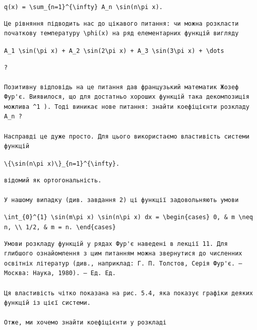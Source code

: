 \documentclass[
  ukrainian,
]{article}
\begin{document}
\texttt{q(x)\ =\ \textbackslash{}sum\_\{n=1\}\^{}\{\textbackslash{}infty\}\ A\_n\ \textbackslash{}sin(n\textbackslash{}pi\ x).}

\begin{verbatim}
Це рівняння підводить нас до цікавого питання: чи можна розкласти початкову температуру \phi(x) на ряд елементарних функцій вигляду
\end{verbatim}

\texttt{A\_1\ \textbackslash{}sin(\textbackslash{}pi\ x)\ +\ A\_2\ \textbackslash{}sin(2\textbackslash{}pi\ x)\ +\ A\_3\ \textbackslash{}sin(3\textbackslash{}pi\ x)\ +\ \textbackslash{}dots}

\begin{verbatim}
?

Позитивну відповідь на це питання дав французький математик Жозеф Фур'є. Виявилося, що для достатньо хороших функцій така декомпозиція можлива ^1 ). Тоді виникає нове питання: знайти коефіцієнти розкладу A_n ?

Насправді це дуже просто. Для цього використаємо властивість системи функцій
\end{verbatim}

\texttt{\textbackslash{}\{\textbackslash{}sin(n\textbackslash{}pi\ x)\textbackslash{}\}\_\{n=1\}\^{}\{\textbackslash{}infty\}.}

\begin{verbatim}
відомий як ортогональність.

У нашому випадку (див. завдання 2) ці функції задовольняють умови
\end{verbatim}

\texttt{\textbackslash{}int\_\{0\}\^{}\{1\}\ \textbackslash{}sin(m\textbackslash{}pi\ x)\ \textbackslash{}sin(n\textbackslash{}pi\ x)\ dx\ =\ \textbackslash{}begin\{cases\}\ 0,\ \&\ m\ \textbackslash{}neq\ n,\ \textbackslash{}\textbackslash{}\ 1/2,\ \&\ m\ =\ n.\ \textbackslash{}end\{cases\}}

\begin{verbatim}
Умови розкладу функцій у рядах Фур'є наведені в лекції 11. Для глибшого ознайомлення з цим питанням можна звернутися до численних освітніх літератур (див., наприклад: Г. П. Толстов, Серія Фур'є. — Москва: Наука, 1980). — Ед. Ед.

Ця властивість чітко показана на рис. 5.4, яка показує графіки деяких функцій із цієї системи.

Отже, ми хочемо знайти коефіцієнти у розкладі
\end{verbatim}
\end{document}
